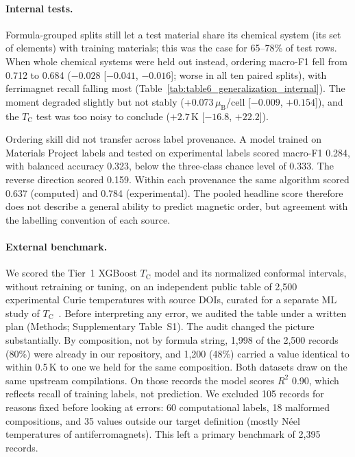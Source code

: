 \documentclass[pdflatex,sn-nature]{sn-jnl}
\newcommand{\muB}{\ensuremath{\mu_\mathrm{B}}}
\newcommand{\Tc}{\ensuremath{T_\mathrm{C}}}
\begin{document}
\paragraph{Internal tests.} Formula-grouped splits still let a test material share its chemical system (its set of elements) with training materials; this was the case for 65--78\% of test rows. When whole chemical systems were held out instead, ordering macro-F1 fell from 0.712 to 0.684 ($-0.028$ [$-0.041$, $-0.016$]; worse in all ten paired splits), with ferrimagnet recall falling most (Table~\ref{tab:table6_generalization_internal}). The moment degraded slightly but not stably (+0.073\,\muB{}/cell [$-0.009$, $+0.154$]), and the \Tc{} test was too noisy to conclude ($+2.7$\,K [$-16.8$, $+22.2$]).

Ordering skill did not transfer across label provenance. A model trained on Materials Project labels and tested on experimental labels scored macro-F1 0.284, with balanced accuracy 0.323, below the three-class chance level of 0.333. The reverse direction scored 0.159. Within each provenance the same algorithm scored 0.637 (computed) and 0.784 (experimental). The pooled headline score therefore does not describe a general ability to predict magnetic order, but agreement with the labelling convention of each source.



\paragraph{External benchmark.} We scored the Tier~1 XGBoost \Tc{} model and its normalized conformal intervals, without retraining or tuning, on an independent public table of 2,500 experimental Curie temperatures with source DOIs, curated for a separate ML study of \Tc{}~\cite{malaei_magnetic_data,abediorang2026curie}. Before interpreting any error, we audited the table under a written plan (Methods; Supplementary Table~S1). The audit changed the picture substantially. By composition, not by formula string, 1,998 of the 2,500 records (80\%) were already in our repository, and 1,200 (48\%) carried a value identical to within 0.5\,K to one we held for the same composition. Both datasets draw on the same upstream compilations. On those records the model scores $R^2$ 0.90, which reflects recall of training labels, not prediction. We excluded 105 records for reasons fixed before looking at errors: 60 computational labels, 18 malformed compositions, and 35 values outside our target definition (mostly N\'eel temperatures of antiferromagnets). This left a primary benchmark of 2,395 records.
\end{document}
